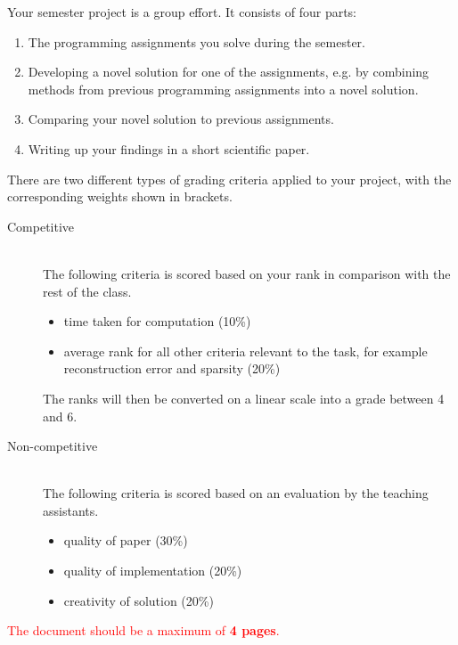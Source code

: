 \documentclass[10pt,conference,compsocconf]{IEEEtran}
\begin{document}
Your semester project is a group effort. It consists of four parts:
\begin{enumerate}
\item The programming assignments you solve during the semester.
\item Developing a novel solution for one of the assignments, e.g. by
  combining methods from previous programming assignments into a novel
  solution.
\item Comparing your novel solution to previous assignments.
\item Writing up your findings in a short scientific paper.
\end{enumerate}

There are two different types of grading criteria applied to your
project, with the corresponding weights shown in brackets.
\begin{description}
\item[Competitive] \ \\
  The following criteria is scored based on your rank
  in comparison with the rest of the class.
  \begin{itemize}
  \item time taken for computation (10\%)
  \item average rank for all other criteria relevant to the task, for
    example reconstruction error and sparsity (20\%)
  \end{itemize}
  The ranks will then be converted on a linear scale into a grade
  between 4 and 6.
\item[Non-competitive] \ \\
  The following criteria is scored based on an
  evaluation by the teaching assistants.
  \begin{itemize}
  \item quality of paper (30\%)
  \item quality of implementation (20\%)
  \item creativity of solution (20\%)
  \end{itemize}
\end{description}

\textcolor{red}{The document should be a maximum of {\bf 4 pages}.}\\
\end{document}
